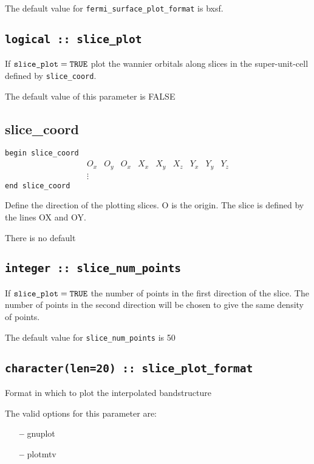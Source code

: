 The default value for \verb#fermi_surface_plot_format# is bxsf.


\subsection[slice\_plot]{\tt logical :: slice\_plot}

If $\verb#slice_plot#=\verb#TRUE#$ plot the wannier orbitals along
 slices in the super-unit-cell defined by \verb#slice_coord#.




The default value of this parameter is FALSE

\subsection[slice\_coord]{slice\_coord}

\noindent \verb#begin slice_coord#
$$
\begin{array}{ccccccccc}
O_x & O_y & O_x & X_x & X_y & X_z & Y_x & Y_y & Y_z \\
\vdots
\end{array}
$$
\verb#end slice_coord#

Define the direction of the plotting slices. O is the origin. The slice
is defined by the lines OX and OY.

There is no default

\subsection[slice\_num\_points]{\tt integer :: slice\_num\_points}

If $\verb#slice_plot#=\verb#TRUE#$ the number of points in the first
direction of the slice. The number of points in the second direction
will be chosen to give the same density of points.

The default value for \verb#slice_num_points# is 50


\subsection[slice\_plot\_format]{\tt character(len=20) :: slice\_plot\_format}

Format in which to plot the interpolated bandstructure

The valid options for this parameter are:
\begin{itemize}
\item[{\bf --}] gnuplot
\item[{\bf --}] plotmtv
\end{itemize}


